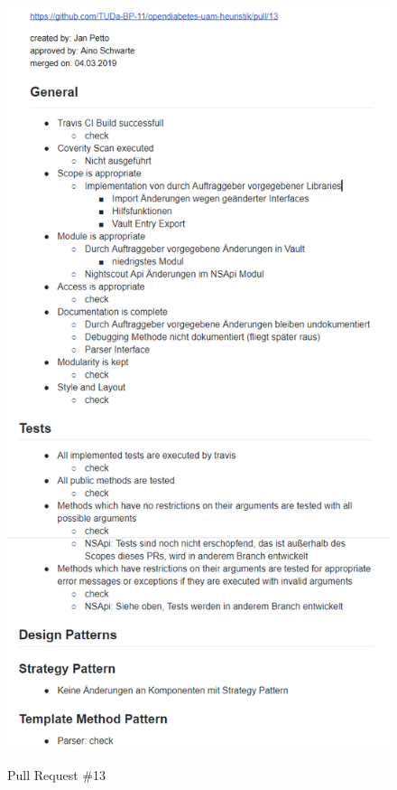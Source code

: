 \documentclass[accentcolor=tud0b,12pt,paper=a4]{tudreport}
\begin{document}
\begin{figure}[h]
\centering
\caption{Pull Request \#13}
\includegraphics[width=\textwidth,height=\textheight,keepaspectratio]{pr-13}
\label{pr:13}
\end{figure}
\end{document}
